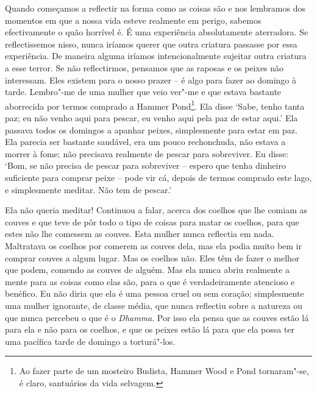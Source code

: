 Quando começamos a reflectir na forma como as coisas são e nos lembramos
dos momentos em que a nossa vida esteve realmente em perigo, sabemos
efectivamente o quão horrível é. É uma experiência absolutamente
aterradora. Se reflectissemos nisso, nunca iríamos querer que outra
criatura passasse por essa experiência. De maneira alguma iríamos
intencionalmente sujeitar outra criatura a esse terror. Se não
reflectirmos, pensamos que as raposas e os peixes não interessam. Eles
existem para o nosso prazer -- é algo para fazer ao domingo à tarde.
Lembro"-me de uma mulher que veio ver"-me e que estava bastante aborrecida
por termos comprado a Hammer Pond\footnote{%
  Ao fazer parte de um mosteiro Budista, Hammer Wood e Pond tornaram"-se,
  é claro, santuários da vida selvagem.}.
Ela disse `Sabe, tenho tanta paz; eu
não venho aqui para pescar, eu venho aqui pela paz de estar aqui.' Ela
passava todos os domingos a apanhar peixes, simplesmente para estar em
paz. Ela parecia ser bastante saudável, era um pouco rechonchuda, não
estava a morrer à fome; não precisava realmente de pescar para
sobreviver. Eu disse: `Bom, se não precisa de pescar para sobreviver --
espero que tenha dinheiro suficiente para comprar peixe -- pode vir cá,
depois de termos comprado este lago, e simplesmente meditar. Não tem de
pescar.'

Ela não queria meditar! Continuou a falar, acerca dos coelhos que lhe
comiam as couves e que teve de pôr todo o tipo de coisas para matar os
coelhos, para que estes não lhe comessem as couves. Esta mulher nunca
reflectia em nada. Maltratava os coelhos por comerem as couves dela, mas
ela podia muito bem ir comprar couves a algum lugar. Mas os coelhos não.
Eles têm de fazer o melhor que podem, comendo as couves de alguém. Mas
ela nunca abriu realmente a mente para as coisas como elas são, para o
que é verdadeiramente atencioso e benéfico. Eu não diria que ela é uma
pessoa cruel ou sem coração; simplesmente uma mulher ignorante, de
classe média, que nunca reflectiu sobre a natureza ou que nunca percebeu
o que é o \emph{Dhamma}. Por isso ela pensa que as couves estão lá para
ela e não para os coelhos, e que os peixes estão lá para que ela possa
ter uma pacífica tarde de domingo a torturá"-los.

